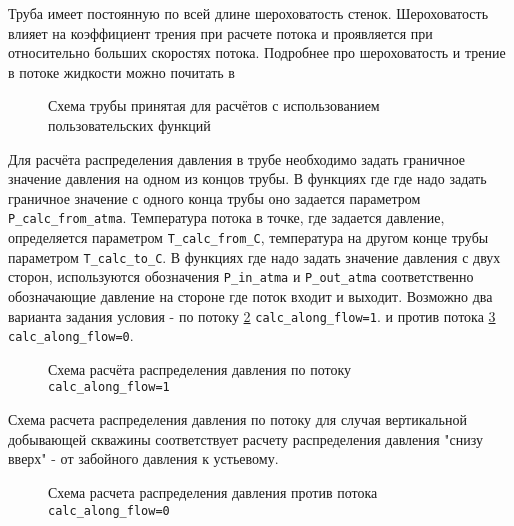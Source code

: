 Труба имеет постоянную по всей длине шероховатость стенок. Шероховатость влияет на коэффициент трения при расчете потока и проявляется при относительно больших скоростях потока. Подробнее про шероховатость и трение в потоке жидкости можно почитать в \cite{Bratland_Pipe_Flow_1}

\begin{figure}[h!]
	\begin{center}
		
		\caption{Схема трубы принятая для расчётов с использованием пользовательских функций}
		\label{ris:Pipe_scheme_1}
	\end{center}
\end{figure}

Для расчёта распределения давления в трубе необходимо задать граничное значение давления на одном из концов трубы. В функциях где где надо задать граничное значение с одного конца трубы оно задается параметром  \texttt{P_calc_from_atma}. Температура потока в точке, где задается давление, определяется параметром  \texttt{T_calc_from_C}, температура на другом конце трубы  параметром \texttt{T_calc_to_C}.  В функциях где надо задать значение давления с двух сторон, используются обозначения \texttt{P_in_atma} и \texttt{P_out_atma} соответственно обозначающие давление на стороне где поток входит и выходит. 
Возможно два варианта задания условия - по потоку  \ref{ris:Pipe_scheme_2}  \texttt{calc_along_flow=1}. и против потока  \ref{ris:Pipe_scheme_3} \texttt{calc_along_flow=0}. 

\begin{figure}[h!]
	\begin{center}
				
		\caption{Схема расчёта распределения давления по потоку \texttt{calc_along_flow=1}}
		\label{ris:Pipe_scheme_2}
	\end{center}
\end{figure} 

Схема расчета распределения давления по потоку для случая вертикальной добывающей скважины соответствует расчету распределения давления "снизу вверх" - от забойного давления к устьевому.

\begin{figure}[h!]
	\begin{center}
		
		\caption{Схема расчета распределения давления против потока \texttt{calc_along_flow=0}}
		\label{ris:Pipe_scheme_3}
	\end{center}
\end{figure} 

